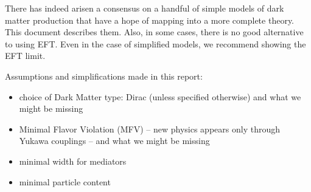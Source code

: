 There has indeed arisen a consensus on a handful of simple models
of dark matter production that have a hope of mapping into a more
complete theory.  This document describes them.  Also, in some cases,
there is no good alternative to using EFT.  Even in the case of simplified
models, we recommend showing the EFT limit.

Assumptions and simplifications made in this report:
\begin{itemize}
\item choice of Dark Matter type: Dirac (unless specified otherwise)
  and what we might be missing
\item Minimal Flavor Violation (MFV) -- new physics appears only
  through Yukawa couplings -- and what we might be missing
\item minimal width for mediators
\item minimal particle content
\end{itemize}
